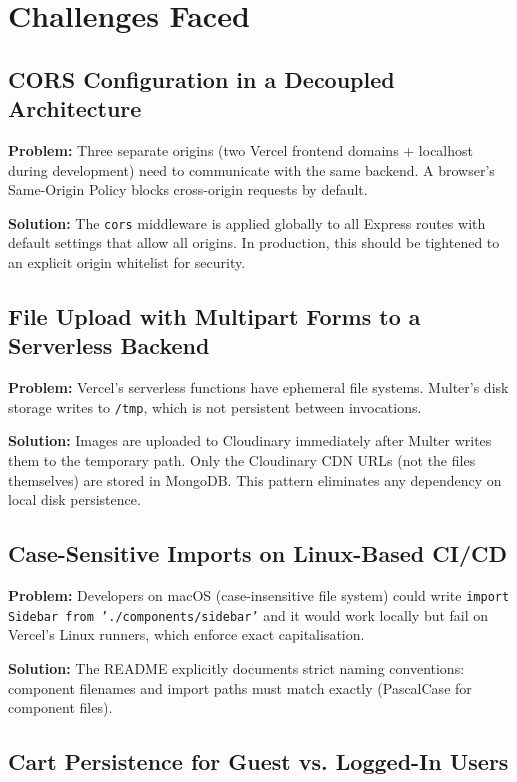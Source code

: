 \documentclass[12pt,a4paper]{report}
\begin{document}
\chapter{Challenges Faced}

\section{CORS Configuration in a Decoupled Architecture}

\textbf{Problem:} Three separate origins (two Vercel frontend domains + localhost during
development) need to communicate with the same backend.
A browser's Same-Origin Policy blocks cross-origin requests by default.

\textbf{Solution:} The \texttt{cors} middleware is applied globally to all Express routes
with default settings that allow all origins.
In production, this should be tightened to an explicit origin whitelist for security.

\section{File Upload with Multipart Forms to a Serverless Backend}

\textbf{Problem:} Vercel's serverless functions have ephemeral file systems.
Multer's disk storage writes to \texttt{/tmp}, which is not persistent between invocations.

\textbf{Solution:} Images are uploaded to Cloudinary immediately after Multer writes them
to the temporary path.
Only the Cloudinary CDN URLs (not the files themselves) are stored in MongoDB.
This pattern eliminates any dependency on local disk persistence.

\section{Case-Sensitive Imports on Linux-Based CI/CD}

\textbf{Problem:} Developers on macOS (case-insensitive file system) could write
\texttt{import Sidebar from './components/sidebar'} and it would work locally but fail on
Vercel's Linux runners, which enforce exact capitalisation.

\textbf{Solution:} The README explicitly documents strict naming conventions:
component filenames and import paths must match exactly (PascalCase for component files).

\section{Cart Persistence for Guest vs. Logged-In Users}
\end{document}
